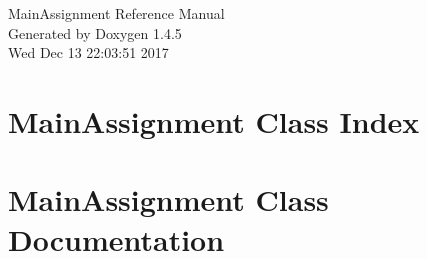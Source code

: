 \documentclass[a4paper]{book}
\begin{document}
\begin{titlepage}
\vspace*{7cm}
\begin{center}
{\Large Main\-Assignment Reference Manual}\\
\vspace*{1cm}
{\large Generated by Doxygen 1.4.5}\\
\vspace*{0.5cm}
{\small Wed Dec 13 22:03:51 2017}\\
\end{center}
\end{titlepage}
\clearemptydoublepage
{}
\tableofcontents
\clearemptydoublepage
{}
\chapter{Main\-Assignment Class Index}

\chapter{Main\-Assignment Class Documentation}









\printindex
\end{document}
